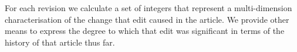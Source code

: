 For each revision we calculate a set of integers that represent a
multi-dimension characterisation of the change that edit caused in the
article. We provide other means to express the degree to which that
edit was significant in terms of the history of that article thus far.





